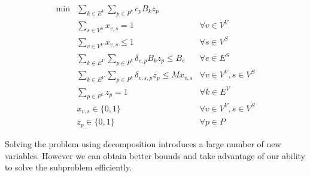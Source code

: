 \begin{align}
  \min  & \sum\limits_{k \in E^{V}}\sum\limits_{p \in P^k}  c_{p} B_k z_{p} \label{eq:obj} \\
        & \sum\limits_{s \in V^{S}} x_{v,s} = 1                                  & \forall v \in V^{V} \label{eq:virone} \\
        & \sum\limits_{v \in V^{V}} x_{v,s} \leq 1                               & \forall s \in V^{S} \label{eq:subone} \\
        & \sum\limits_{k \in E^{V}}\sum\limits_{p \in P^{k}} \delta_{e,p} B_{k} z_{p} \leq B_{e} & \forall e \in E^{S} \label{eq:bandwidth} \\
        & \sum\limits_{k \in E^{V}}\sum\limits_{p \in P^k} \delta_{v,s,p} z_{p} \leq M x_{v,s} & \forall v \in V^{V}, s \in V^{S} \label{eq:onlyoneaux}\\
        & \sum\limits_{p \in P^{k}} z_{p} = 1                                    & \forall k \in E^{V} \label{eq:virdemone} \\
        &  x_{v,s} \in \{0,1\}  & \forall v \in V^{V}, s \in V^{S} \nonumber \\
        & z_{p} \in \{0,1\}    & \forall p \in {P} \nonumber
\end{align}

Solving the problem using decomposition introduces a large number of new variables. However we can obtain better bounds and take advantage of our ability to solve the subproblem efficiently.
